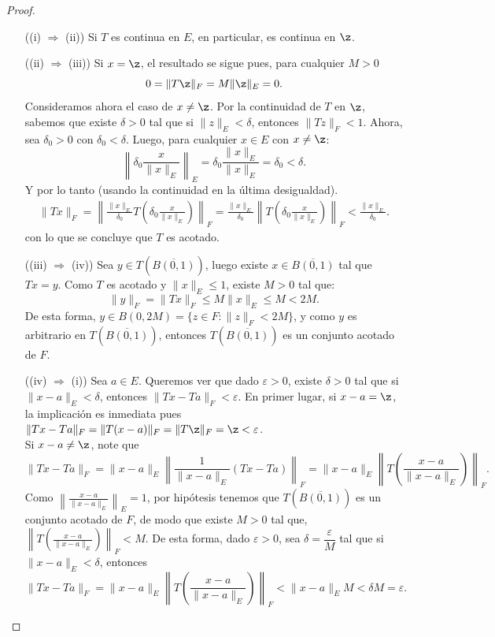 \begin{proof}
\begin{itemize}
    \item[((i)] $\Rightarrow$ (ii)) Si $T$ es continua en $E$, en particular, es continua en $\z$.
    \item[((ii)] $\Rightarrow$ (iii)) Si $x=\z$, el resultado se sigue pues, para cualquier $M>0$
    \[
    0=\|T\z\|_F=M\|\z\|_E=0.
    \]
    Consideramos ahora el caso de $x\neq\z$. Por la continuidad de $T$ en $\z$, sabemos que existe $\delta>0$ tal que si $\|z\|_E<\delta$, entonces $\|Tz\|_F<1$. Ahora, sea $\delta_0>0$ con $\delta_0<\delta$. Luego, para cualquier $x\in E$ con $x\neq \z$:
    \[
    \left\|\delta_0\frac{x}{\|x\|_E}\right\|_E=\delta_0\frac{\|x\|_E}{\|x\|_E}=\delta_0<\delta.
    \]
    Y por lo tanto (usando la continuidad en la última desigualdad).
    \begin{align*}
    \|Tx\|_F=\left\|\frac{\|x\|_E}{\delta_0}T\left(\delta_0\frac{x}{\|x\|_E}\right)\right\|_F=\frac{\|x\|_E}{\delta_0}\left\|T\left(\delta_0\frac{x}{\|x\|_E}\right)\right\|_F<\frac{\|x\|_E}{\delta_0}.
    \end{align*}
    con lo que se concluye que $T$ es acotado.
    \item[((iii)] $\Rightarrow$ (iv)) Sea $y \in T(\overline{B(0,1)})$, luego existe $x \in \overline{B(0,1)}$ tal que $Tx=y$. Como $T$ es acotado y $\|x\|_E\leq1$, existe $M>0$ tal que:
    \[
    \|y\|_F=\|Tx\|_F\leq M\|x\|_E\leq M<2M.
    \]
    De esta forma, $y \in B(0,2M)=\{z\in F: \|z\|_F<2M\}$, y como $y$ es arbitrario en $T(\overline{B(0,1)})$, entonces $T(\overline{B(0,1)})$ es un conjunto acotado de $F$.
    \item[((iv)]$\Rightarrow$ (i)) Sea $a\in E$. Queremos ver que dado $\varepsilon>0$, existe $\delta>0$ tal que si\\
    $\|x-a\|_E<\delta$, entonces $\|Tx-Ta\|_F<\varepsilon$. En primer lugar, si $x-a=\z$, la implicación es inmediata pues $\|Tx-Ta\|_F=\|T(x-a)\|_F=\|T\z\|_F=\z<\varepsilon$.
    \\
    Si $x-a\neq\z$, note que
    \[
    \|Tx-Ta\|_F=\|x-a\|_E\left\|\frac{1}{\|x-a\|_E}(Tx-Ta)\right\|_F=\|x-a\|_E\left\|T\left(\frac{x-a}{\|x-a\|_E}\right)\right\|_F.
    \]
    Como $\left\|\frac{x-a}{\|x-a\|_E}\right\|_E=1$, por hipótesis tenemos que $T(\overline{B(0,1)})$ es un conjunto acotado de $F$, de modo que existe $M>0$ tal que, $\left\|T\left(\frac{x-a}{\|x-a\|_E}\right)\right\|_F<M$. De esta forma, dado $\varepsilon>0$, sea $\delta=\dfrac{\varepsilon}{M}$ tal que si $\|x-a\|_E<\delta$, entonces
    \[
    \|Tx-Ta\|_F=\|x-a\|_E\left\|T\left(\frac{x-a}{\|x-a\|_E}\right)\right\|_F<\|x-a\|_EM<\delta M=\varepsilon.
    \]
\end{itemize}
\end{proof}

